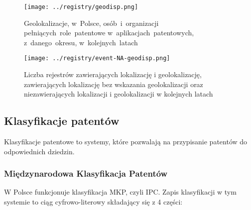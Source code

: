 \begin{figure}[H]\centering
\texttt{[image: ../registry/geodisp.png]}
\caption{Geolokalizacje,
         w~Polsce,
         osób~i~organizacji 
         pełniących~role~patentowe 
         w~aplikacjach~patentowych,
         z~danego~okresu,
         w~kolejnych~latach}
\label{fig:geodisp.png}
\end{figure}

\begin{figure}[H]\centering
\texttt{[image: ../registry/event-NA-geodisp.png]}
\caption{Liczba rejestrów zawierających lokalizację i geolokalizację,
         zawierających lokalizację bez wskazania geolokalizacji
         oraz niezawierających lokalizacji i geolokalizacji 
         w kolejnych latach}
\label{fig:geodisp.png}
\end{figure}



\subsection{Klasyfikacje patentów}

Klasyfikacje patentowe to systemy, które pozwalają na przypisanie
patentów do odpowiednich dziedzin.



\subsubsection{Międzynarodowa Klasyfikacja Patentów}

W Polsce funkcjonuje klasyfikacja
\ac{MKP}, czyli \ac{IPC}. Zapis klasyfikacji w tym systemie to ciąg
cyfrowo-literowy składający się z 4 części:

